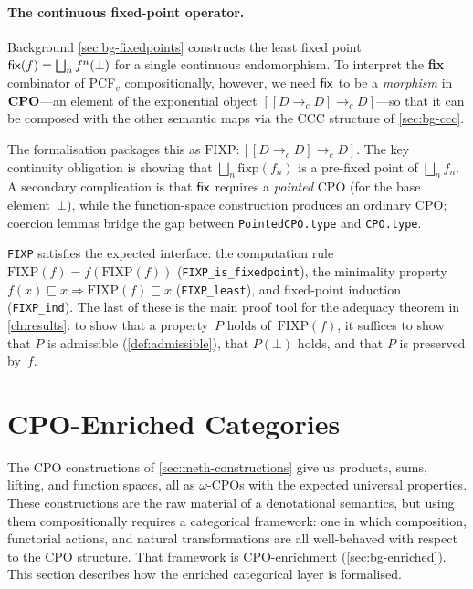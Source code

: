\paragraph{The continuous fixed-point operator.}
Background \cref{sec:bg-fixedpoints} constructs the least fixed point
$\mathsf{fix}(f) = \bigsqcup_n f^n(\bot)$ for a single continuous
endomorphism.  To interpret the \textbf{fix} combinator of PCF$_v$
compositionally, however, we need $\mathsf{fix}$ to be a \emph{morphism} in
$\mathbf{CPO}$---an element of the exponential object
$[[D \to_c D] \to_c D]$---so that it can be composed with the other
semantic maps via the CCC structure of \cref{sec:bg-ccc}.

The formalisation packages this as
$\mathrm{FIXP} : [[D \to_c D] \to_c D]$.
The key continuity obligation is showing that
$\bigsqcup_n \mathrm{fixp}(f_n)$ is a pre-fixed point of
$\bigsqcup_n f_n$.  A secondary complication is that $\mathsf{fix}$ requires
a \emph{pointed} CPO (for the base element~$\bot$), while the
function-space construction produces an ordinary CPO; coercion lemmas
bridge the gap between \texttt{PointedCPO.type} and
\texttt{CPO.type}.

\texttt{FIXP} satisfies the expected interface: the computation rule
$\mathrm{FIXP}(f) = f(\mathrm{FIXP}(f))$
(\texttt{FIXP\_is\_fixedpoint}), the minimality property
$f(x) \sqsubseteq x \Rightarrow \mathrm{FIXP}(f) \sqsubseteq x$
(\texttt{FIXP\_least}), and fixed-point induction
(\texttt{FIXP\_ind}).  The last of these is the main proof tool for the
adequacy theorem in \cref{ch:results}: to show that a property~$P$
holds of~$\mathrm{FIXP}(f)$, it suffices to show that $P$ is
admissible (\cref{def:admissible}), that $P(\bot)$ holds, and that $P$
is preserved by~$f$.

\section{CPO-Enriched Categories}
\label{sec:meth-enriched}


The CPO constructions of \cref{sec:meth-constructions} give us products,
sums, lifting, and function spaces, all as $\omega$-CPOs with the
expected universal properties.  These constructions are the raw
material of a denotational semantics, but using them compositionally
requires a categorical framework: one in which composition,
functorial actions, and natural transformations are all well-behaved
with respect to the CPO structure.  That framework is CPO-enrichment
(\cref{sec:bg-enriched}).  This section describes how the enriched
categorical layer is formalised.

